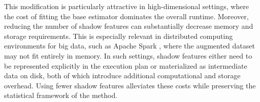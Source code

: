 \documentclass[runningheads]{llncs}
\begin{document}
This modification is particularly attractive in high-dimensional settings, where the cost of fitting the base estimator dominates the overall runtime. Moreover, reducing the number of shadow features can substantially decrease memory and storage requirements. This is especially relevant in distributed computing environments for big data, such as Apache Spark \cite{zaharia2016spark}, where the augmented dataset may not fit entirely in memory. In such settings, shadow features either need to be represented explicitly in the execution plan or materialized as intermediate data on disk, both of which introduce additional computational and storage overhead. Using fewer shadow features alleviates these costs while preserving the statistical framework of the method.




\end{document}
